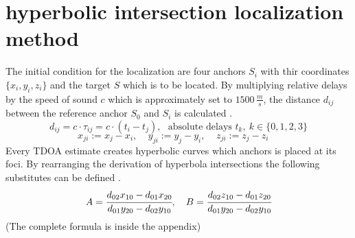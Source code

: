 \section{hyperbolic intersection localization method}

The initial condition for the localization are four anchors $S_i$ with thir coordinates $\{x_i,y_i,z_i\}$ and the target $S$ which is to be located. By multiplying relative delays by the speed of sound $c$ which is approximately set to $1500\,\frac{m}{s}$, the distance $d_{ij}$ between the reference anchor $S_0$ and $S_i$ is calculated  \cite{yang11}.\\
\begin{equation}
	d_{ij}=c\cdot\tau_{ij}=c\cdot (t_i-t_j),~~~\text{absolute delays } t_k,~k\in \{0,1,2,3\}
\end{equation}
\begin{equation}
	x_{ji}:=x_j-x_i,~~~~~
	y_{ji}:=y_j-y_i,~~~~~
	z_{ji}:=z_j-z_i~~~~~
\end{equation}
Every TDOA estimate creates hyperbolic curves which anchors is placed at its foci. 
By rearranging the derivation of hyperbola intersections the following substitutes can be defined \cite{bucher02}. 
\begin{equation}
	{A}=\cfrac{d_{02}x_{10}-d_{01}x_{20}}{d_{01}y_{20}-d_{02}y_{10}},~~~
	{B}=\cfrac{d_{02}z_{10}-d_{01}z_{20}}{d_{01}y_{20}-d_{02}y_{10}}
\end{equation}	
(The complete formula is inside the appendix)
%
%
